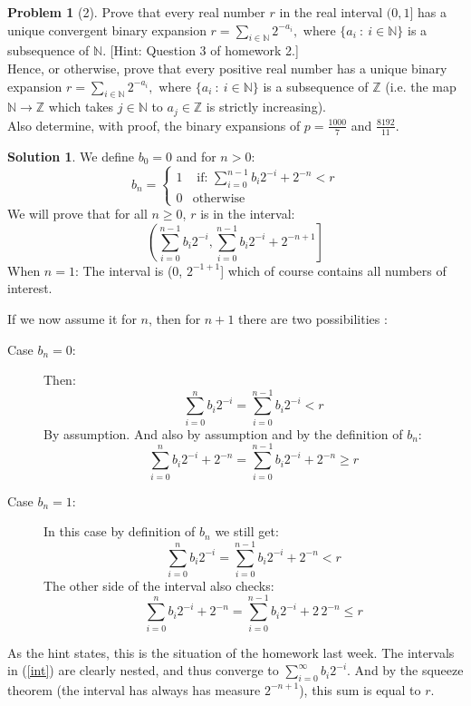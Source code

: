 \documentclass{article}
\theoremstyle{definition}
\newtheorem*{soln}{Solution}
\newtheorem*{prob}{Problem}
\theoremstyle{theorem}
\newcommand{\Z}{\mathbb{Z}}
\newcommand{\N}{\mathbb{N}}
\begin{document}
\begin{prob}[2]
Prove that every real number $r$ in the real interval $(0,1]$ has a unique convergent binary expansion $r = \sum_{i \in \N} 2^{-a_i},$ where $\{a_i \ : \ i \in \N \}$ is a subsequence of $\N$. [Hint: Question 3 of homework 2.]\\
Hence, or otherwise, prove that every positive real number has a unique binary expansion $r = \sum_{i \in \N} 2^{-a_i},$ where $\{ a_i \ : \ i \in \N\}$ is a subsequence of $\Z$ (i.e. the map $\N \to \Z$ which takes $j \in \N$ to $a_j \in \Z$ is strictly increasing).\\
Also determine, with proof, the binary expansions of $p = \frac{1000}{7}$ and $\frac{8192}{11}.$
\end{prob}
\begin{soln}
    We define $b_{0} =0$ and for $n>0$:
    $$b_n =\begin{cases} 1 & \text{ if: } \sum_{i=0}^{n-1} b_i 2^{-i} + 2^{-n} <r\\ 0 & \text{otherwise}\end{cases}$$
        We will prove that for all $n\geq 0$, $r$ is in the interval:
        \begin{equation}\label{int}
            \left(\left.\sum_{i=0}^{n-1} b_i2^{-i} , \sum_{i=0}^{n-1} b_i2^{-i} + 2^{-n+1}\right]\right.
        \end{equation}
            When $n=1$: The interval is  (0, $2^{-1+1}$] which of course contains all numbers of interest.

            If we now assume it for $n$, then for $n+1$ there are two possibilities :
        \begin{description}
            \item[Case $b_{n} = 0$:] Then:
                $$\sum_{i=0}^{n} b_i2^{-i} = \sum_{i=0}^{n-1} b_i2^{-i} < r$$
                By assumption. And also by assumption and by the definition of $b_n$: 
                $$ \sum_{i=0}^{n} b_i2^{-i} + 2^{-n} = \sum_{i=0}^{n-1} b_i2^{-i}+ 2^{-n}\geq r $$
            \item[Case $b_n = 1$:] In this case by definition of $b_n$ we still get:
                $$\sum_{i=0}^{n} b_i2^{-i} = \sum_{i=0}^{n-1} b_i2^{-i} + 2^{-n} < r $$
The other side of the interval also checks:
                $$\sum_{i=0}^{n} b_i2^{-i}+2^{-n} = \sum_{i=0}^{n-1} b_i2^{-i} +2\, 2^{-n}\leq r$$
        \end{description}
        As the hint states, this is the situation of the homework last week. The intervals in (\ref{int}) are clearly nested, and thus converge to $\sum_{i=0}^{\infty} b_i2^{-i} $. And by the squeeze theorem (the interval has always has measure $2^{-n+1}$), this sum is equal to $r$.


\end{soln}
\end{document}
